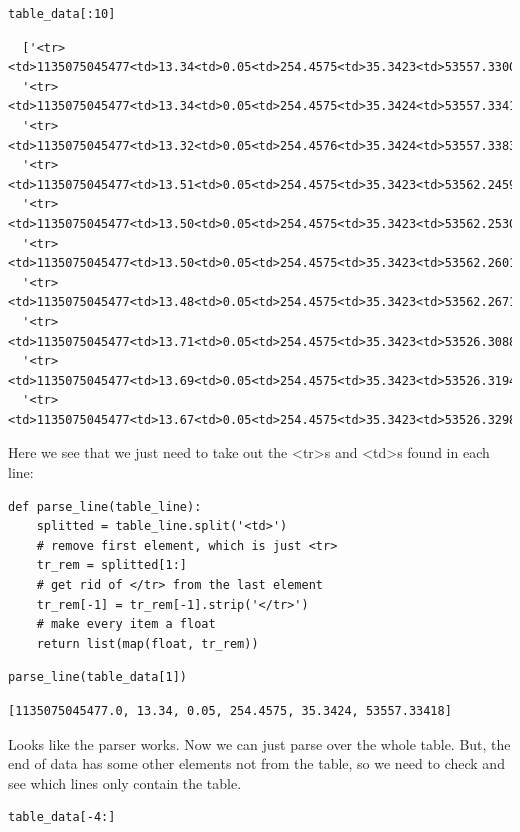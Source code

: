 \documentclass[11pt]{article}
\begin{document}
\begin{verbatim}
table_data[:10]
\end{verbatim}

\begin{verbatim}
  ['<tr><td>1135075045477<td>13.34<td>0.05<td>254.4575<td>35.3423<td>53557.33004</tr>',
  '<tr><td>1135075045477<td>13.34<td>0.05<td>254.4575<td>35.3424<td>53557.33418</tr>',
  '<tr><td>1135075045477<td>13.32<td>0.05<td>254.4576<td>35.3424<td>53557.33834</tr>',
  '<tr><td>1135075045477<td>13.51<td>0.05<td>254.4575<td>35.3423<td>53562.24598</tr>',
  '<tr><td>1135075045477<td>13.50<td>0.05<td>254.4575<td>35.3423<td>53562.25304</tr>',
  '<tr><td>1135075045477<td>13.50<td>0.05<td>254.4575<td>35.3423<td>53562.26014</tr>',
  '<tr><td>1135075045477<td>13.48<td>0.05<td>254.4575<td>35.3423<td>53562.26718</tr>',
  '<tr><td>1135075045477<td>13.71<td>0.05<td>254.4575<td>35.3423<td>53526.30884</tr>',
  '<tr><td>1135075045477<td>13.69<td>0.05<td>254.4575<td>35.3423<td>53526.31949</tr>',
  '<tr><td>1135075045477<td>13.67<td>0.05<td>254.4575<td>35.3423<td>53526.32984</tr>']
\end{verbatim}

Here we see that we just need to take out the <tr>s and <td>s found in each line:
\begin{verbatim}
def parse_line(table_line):
    splitted = table_line.split('<td>')
    # remove first element, which is just <tr>
    tr_rem = splitted[1:]
    # get rid of </tr> from the last element
    tr_rem[-1] = tr_rem[-1].strip('</tr>')
    # make every item a float
    return list(map(float, tr_rem))
\end{verbatim}


\begin{verbatim}
parse_line(table_data[1])
\end{verbatim}

\begin{verbatim}
[1135075045477.0, 13.34, 0.05, 254.4575, 35.3424, 53557.33418]
\end{verbatim}

Looks like the parser works. Now we can just parse over the whole table. But,
the end of data has some other elements not from the table, so we need to check
and see which lines only contain the table.

\begin{verbatim}
table_data[-4:]
\end{verbatim}
\end{document}
